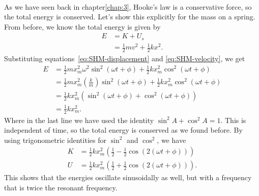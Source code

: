 \documentclass[../classical_mechanics.tex]{subfiles}
\begin{document}
        \paragraph{}
        As we have seen back in chapter\ref{chap:3}, Hooke's law is a conservative force, so the total energy is conserved.
        Let's show this explicitly for the mass on a spring.
        From before, we know the total energy is given by
        \begin{align}
            E&=K+U_s\\
            &=\frac{1}{2}mv^2+\frac{1}{2}kx^2.
        \end{align}
        Substituting equations~\ref{eq:SHM-displacement} and \ref{eq:SHM-velocity}, we get
        \begin{align}
            E&=\frac{1}{2}mx_m^2\omega^2\sin^2(\omega t+\phi)+\frac{1}{2}kx_m^2\cos^2(\omega t+\phi)\\
            &=\frac{1}{2}mx_m^2\left(\frac{k}{m}\right)\sin^2(\omega t+\phi)+\frac{1}{2}kx_m^2\cos^2(\omega t+\phi)\\
            &=\frac{1}{2}kx_m^2\left(\sin^2(\omega t+\phi)+\cos^2(\omega t+\phi)\right)\\
            &=\frac{1}{2}kx_m^2.\label{eq:SHM-total-mech-energy}
        \end{align}
        Where in the last line we have used the identity $\sin^2A+\cos^2A=1$.
        This is independent of time, so the total energy is conserved as we found before.
        By using trigonometric identities for $\sin^2$ and $\cos^2$, we have
        \begin{align}
            K&=\frac{1}{2}kx_m^2\left(\frac{1}{2}-\frac{1}{2}\cos(2(\omega t+\phi))\right)\\
            U&=\frac{1}{2}kx_m^2\left(\frac{1}{2}+\frac{1}{2}\cos(2(\omega t+\phi))\right).
        \end{align}
        This shows that the energies oscillate sinusoidally as well, but with a frequency that is twice the resonant frequency.
\end{document}
